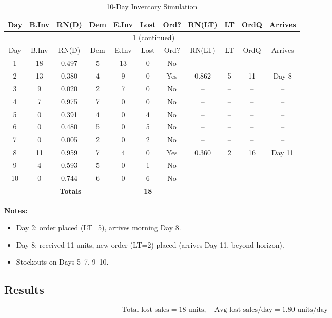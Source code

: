 \documentclass[12pt,a4paper]{article}
\begin{document}
{\small
\begin{longtable}{*{11}{c}}
\caption{10-Day Inventory Simulation}\label{tab:q1} \\
\toprule
Day & B.Inv & RN(D) & Dem & E.Inv & Lost & Ord? & RN(LT) & LT & OrdQ & Arrives \\
\midrule
\endfirsthead
\multicolumn{11}{c}{\tablename\ \ref{tab:q1} (continued)} \\
\toprule
Day & B.Inv & RN(D) & Dem & E.Inv & Lost & Ord? & RN(LT) & LT & OrdQ & Arrives \\
\midrule
\endhead
\bottomrule
\endfoot

1  & 18 & 0.497 & 5 & 13 & 0 & No  & -- & -- & -- & -- \\
2  & 13 & 0.380 & 4 & 9  & 0 & Yes & 0.862 & 5 & 11 & Day 8 \\
3  & 9  & 0.020 & 2 & 7  & 0 & No  & -- & -- & -- & -- \\
4  & 7  & 0.975 & 7 & 0  & 0 & No  & -- & -- & -- & -- \\
5  & 0  & 0.391 & 4 & 0  & 4 & No  & -- & -- & -- & -- \\
6  & 0  & 0.480 & 5 & 0  & 5 & No  & -- & -- & -- & -- \\
7  & 0  & 0.005 & 2 & 0  & 2 & No  & -- & -- & -- & -- \\
8  & 11 & 0.959 & 7 & 4  & 0 & Yes & 0.360 & 2 & 16 & Day 11 \\
9  & 4  & 0.593 & 5 & 0  & 1 & No  & -- & -- & -- & -- \\
10 & 0  & 0.744 & 6 & 0  & 6 & No  & -- & -- & -- & -- \\
\midrule
\multicolumn{5}{c}{\textbf{Totals}} & \textbf{18} & & & & & \\
\end{longtable}
}

\noindent\textbf{Notes:}
\begin{itemize}
  \item Day 2: order placed (LT=5), arrives morning Day 8.
  \item Day 8: received 11 units, new order (LT=2) placed (arrives Day 11, beyond horizon).
  \item Stockouts on Days 5--7, 9--10.
\end{itemize}

\subsection{Results}
\[
\text{Total lost sales} = 18 \text{ units}, \quad
\boxed{\text{Avg lost sales/day} = 1.80 \text{ units/day}}
\]
\end{document}

